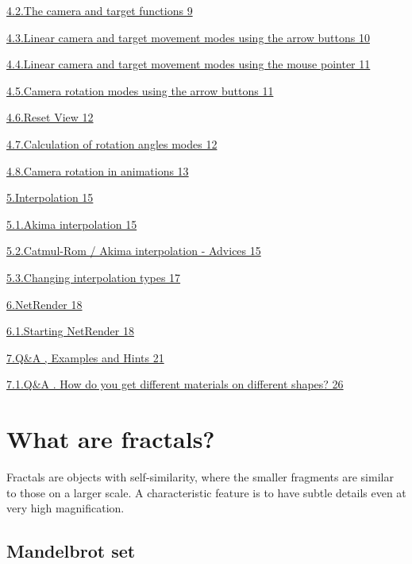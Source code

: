 \protect\hyperlink{the-camera-and-target-functions}{4.2.The camera and
target functions 9}

\protect\hyperlink{linear-camera-and-target-movement-modes-using-the-arrow-buttons}{4.3.Linear
camera and target movement modes using the arrow buttons 10}

\protect\hyperlink{linear-camera-and-target-movement-modes-using-the-mouse-pointer}{4.4.Linear
camera and target movement modes using the mouse pointer 11}

\protect\hyperlink{camera-rotation-modes-using-the-arrow-buttons}{4.5.Camera
rotation modes using the arrow buttons 11}

\protect\hyperlink{reset-view}{4.6.Reset View 12}

\protect\hyperlink{calculation-of-rotation-angles-modes}{4.7.Calculation
of rotation angles modes 12}

\protect\hyperlink{camera-rotation-in-animations}{4.8.Camera rotation in
animations 13}

\protect\hyperlink{interpolation}{5.Interpolation 15}

\protect\hyperlink{akima-interpolation}{5.1.Akima interpolation 15}

\protect\hyperlink{catmul-rom-akima-interpolation---advices}{5.2.Catmul-Rom
/ Akima interpolation - Advices 15}

\protect\hyperlink{changing-interpolation-types}{5.3.Changing
interpolation types 17}

\protect\hyperlink{netrender}{6.NetRender 18}

\protect\hyperlink{starting-netrender}{6.1.Starting NetRender 18}

\protect\hyperlink{qa-examples-and-hints}{7.Q\&A , Examples and Hints
21}

\protect\hyperlink{qa-.-how-do-you-get-different-materials-on-different-shapes}{7.1.Q\&A
. How do you get different materials on different shapes? 26}

\hypertarget{what-are-fractals}{\section{What are
fractals?}\label{what-are-fractals}}

Fractals are objects with self-similarity, where the smaller fragments
are similar to those on a larger scale. A characteristic feature is to
have subtle details even at very high magnification.

\hypertarget{mandelbrot-set}{\subsection{Mandelbrot
set}\label{mandelbrot-set}}

